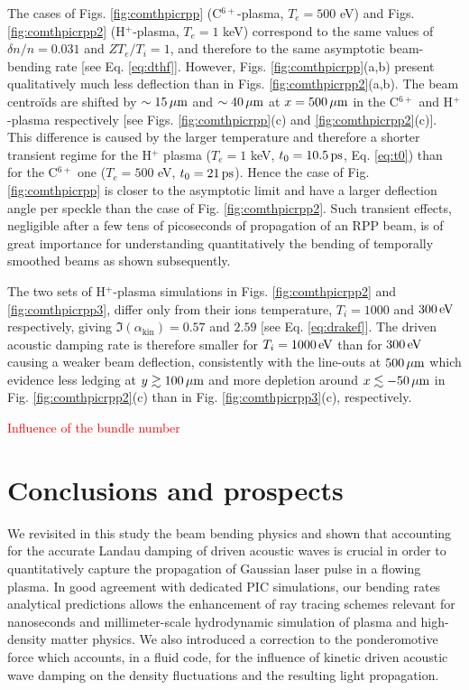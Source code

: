 \documentclass[%
 reprint,
 amsmath,amssymb,
 aps,
]{revtex4-1}
\begin{document}
The cases of Figs.  \ref{fig:comthpicrpp} (C$^{6+}$-plasma, $T_e=500$ eV) and Figs.  \ref{fig:comthpicrpp2} (H$^{+}$-plasma, $T_e=1$ keV)  correspond to the same values of $\delta n /n =0.031 $ and $ZT_e/T_i=1$, and therefore to the same asymptotic beam-bending rate [see Eq. \eqref{eq:dthf}]. However, Figs. \ref{fig:comthpicrpp}(a,b) present qualitatively much less deflection than in Figs. \ref{fig:comthpicrpp2}(a,b). The beam centro\"ids are shifted by $\sim 15\, \rm \mu m$ and  $\sim 40 \, \rm \mu m$ at $x=500 \, \rm \mu m$ in the C$^{6+}$  and H$^{+}$-plasma respectively [see Figs. \ref{fig:comthpicrpp}(c) and \ref{fig:comthpicrpp2}(c)].
This difference is caused by the larger temperature and therefore a shorter transient regime for the  H$^{+}$ plasma ($T_e=1$ keV, $t_0=10.5\, \rm ps$, Eq. \eqref{eq:t0}) than for the C$^{6+}$ one ($T_e=500$ eV, $t_0=21\, \rm ps$).
Hence the case of Fig. \ref{fig:comthpicrpp} is closer to the asymptotic limit and have a larger deflection angle per speckle than the case of Fig. \ref{fig:comthpicrpp2}. Such transient effects, negligible after a few tens of picoseconds of propagation of an RPP beam, is  of great importance  for understanding quantitatively the bending of temporally smoothed beams as shown subsequently.

The two sets of H$^+$-plasma simulations in   Figs. \ref{fig:comthpicrpp2} and  \ref{fig:comthpicrpp3}, 
differ only from their ions temperature, $T_i = 1000$ and $300 \, \rm eV$ respectively, giving  $\Im(\alpha_\mathrm{kin})=0.57$ and $2.59$ [see Eq. \eqref{eq:drakef}]. The driven acoustic damping rate is therefore smaller for  $T_i = 1000\, \rm eV$ than for  $300 \, \rm eV$ causing a weaker beam deflection, consistently with the line-outs at $500\,\rm \mu m$ which evidence less ledging at $y\gtrsim 100\,\rm\mu m$ and more depletion around $x\lesssim -50\,\rm\mu m$ in Fig. \ref{fig:comthpicrpp2}(c) than in  Fig. \ref{fig:comthpicrpp3}(c),  respectively. 

\textcolor{red}{Influence of the bundle number}

\section{Conclusions and prospects}

We revisited in this study the beam bending physics and shown that accounting for the accurate Landau damping of driven acoustic waves is crucial in order to  quantitatively capture the propagation of Gaussian laser pulse in a flowing plasma. 
In good agreement with dedicated PIC simulations, our bending rates analytical predictions allows the enhancement of ray tracing schemes relevant for nanoseconds and millimeter-scale hydrodynamic simulation of plasma and high-density matter  physics. We also introduced  a correction to the ponderomotive force which  accounts, in a fluid code, for the influence of kinetic driven acoustic wave damping on the density fluctuations and the resulting light propagation. 
\end{document}
